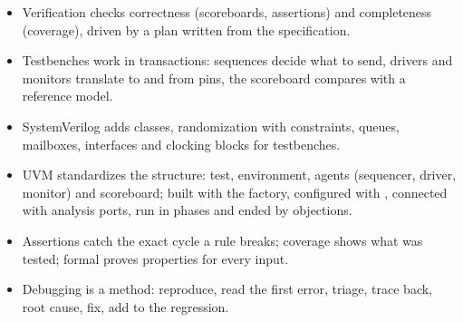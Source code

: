 \begin{itemize}
  \item Verification checks correctness (scoreboards, assertions) and completeness (coverage), driven by a plan written from the specification.
  \item Testbenches work in transactions: sequences decide what to send, drivers and monitors translate to and from pins, the scoreboard compares with a reference model.
  \item SystemVerilog adds classes, randomization with constraints, queues, mailboxes, interfaces and clocking blocks for testbenches.
  \item UVM standardizes the structure: test, environment, agents (sequencer, driver, monitor) and scoreboard; built with the factory, configured with , connected with analysis ports, run in phases and ended by objections.
  \item Assertions catch the exact cycle a rule breaks; coverage shows what was tested; formal proves properties for every input.
  \item Debugging is a method: reproduce, read the first error, triage, trace back, root cause, fix, add to the regression.
\end{itemize}
